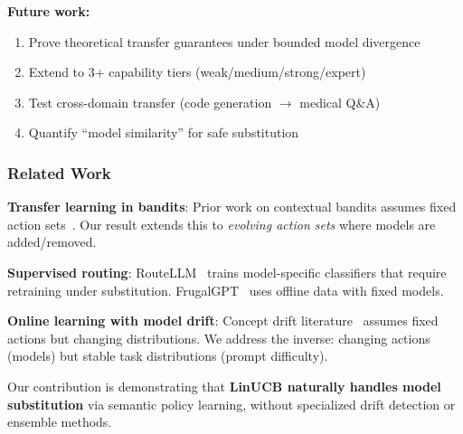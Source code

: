 \textbf{Future work:}
\begin{enumerate}
    \item Prove theoretical transfer guarantees under bounded model divergence
    \item Extend to 3+ capability tiers (weak/medium/strong/expert)
    \item Test cross-domain transfer (code generation $\to$ medical Q\&A)
    \item Quantify ``model similarity'' for safe substitution
\end{enumerate}

\subsubsection{Related Work}

\textbf{Transfer learning in bandits}: Prior work on contextual bandits assumes fixed action sets~\cite{li2010contextual}. Our result extends this to \emph{evolving action sets} where models are added/removed.

\textbf{Supervised routing}: RouteLLM~\cite{ong2024routellm} trains model-specific classifiers that require retraining under substitution. FrugalGPT~\cite{chen2023frugalgpt} uses offline data with fixed models.

\textbf{Online learning with model drift}: Concept drift literature~\cite{gama2014survey} assumes fixed actions but changing distributions. We address the inverse: changing actions (models) but stable task distributions (prompt difficulty).

Our contribution is demonstrating that \textbf{LinUCB naturally handles model substitution} via semantic policy learning, without specialized drift detection or ensemble methods.


